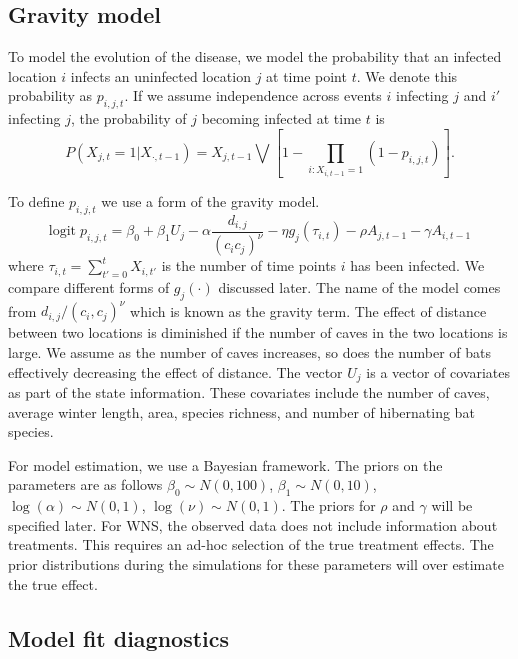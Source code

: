 \documentclass[11pt]{article}
\newcommand{\logit}{\text{logit}}
\begin{document}
\subsection{Gravity model}
\label{sec-2-1}

To model the evolution of the disease, we model the probability that
an infected location $i$ infects an uninfected location $j$ at time
point $t$.  We denote this probability as $p_{i,j,t}$.  If we assume
independence across events $i$ infecting $j$ and $i'$ infecting $j$,
the probability of $j$ becoming infected at time $t$ is
\begin{equation*}
P(X_{j,t} = 1 | X_{\cdot,t-1}) = X_{j,t-1} \bigvee \left[1 - \prod_{i:
X_{i,t-1} = 1} ( 1 - p_{i,j,t} ) \right].
\end{equation*}

To define $p_{i,j,t}$ we use a form of the gravity model.
\begin{equation*}
\logit \; p_{i,j,t} = \beta_0 + \beta_1 U_j 
- \alpha \frac{d_{i,j}}{(c_ic_j)^\nu} - \eta g_j(\tau_{i,t})
- \rho A_{j,t-1} - \gamma A_{i,t-1}
\end{equation*}
where $\tau_{i,t} = \sum_{t' = 0}^t X_{i,t'}$ is the number of time
points $i$ has been infected.  We compare different forms of
$g_j(\cdot)$ discussed later.  The name of the model comes from
$d_{i,j}/(c_i,c_j)^\nu$ which is known as the gravity term.  The
effect of distance between two locations is diminished if the number
of caves in the two locations is large.  We assume as the number of
caves increases, so does the number of bats effectively decreasing the
effect of distance.  The vector $U_j$ is a vector of covariates as
part of the state information.  These covariates include the number of
caves, average winter length, area, species richness, and number of
hibernating bat species.

For model estimation, we use a Bayesian framework.  The priors on the
parameters are as follows $\beta_0 \sim N(0,100)$, $\beta_1 \sim
   N(0,10)$, $\log(\alpha) \sim N(0,1)$, $\log(\nu) \sim N(0,1)$.  The
priors for $\rho$ and $\gamma$ will be specified later.  For WNS, the
observed data does not include information about treatments.  This
requires an ad-hoc selection of the true treatment effects.  The prior
distributions during the simulations for these parameters will over
estimate the true effect.

\subsection{Model fit diagnostics}
\label{sec-2-2}
\end{document}
